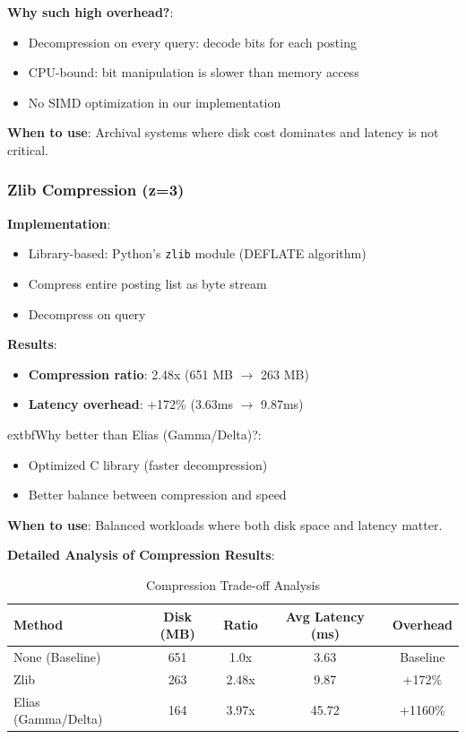 \documentclass[12pt,a4paper]{article}
\begin{document}
\textbf{Why such high overhead?}:
\begin{itemize}
    \item Decompression on every query: decode bits for each posting
    \item CPU-bound: bit manipulation is slower than memory access
    \item No SIMD optimization in our implementation
\end{itemize}

\textbf{When to use}: Archival systems where disk cost dominates and latency is not critical.

\subsubsection{Zlib Compression (z=3)}

\textbf{Implementation}:
\begin{itemize}
    \item Library-based: Python's \texttt{zlib} module (DEFLATE algorithm)
    \item Compress entire posting list as byte stream
    \item Decompress on query
\end{itemize}

\textbf{Results}:
\begin{itemize}
    \item \textbf{Compression ratio}: 2.48x (651 MB $\rightarrow$ 263 MB)
    \item \textbf{Latency overhead}: +172\% (3.63ms $\rightarrow$ 9.87ms)
\end{itemize}

	extbf{Why better than Elias (Gamma/Delta)?}:
\begin{itemize}
    \item Optimized C library (faster decompression)
    \item Better balance between compression and speed
\end{itemize}

\textbf{When to use}: Balanced workloads where both disk space and latency matter.

\textbf{Detailed Analysis of Compression Results}:

\begin{table}[H]
\centering
\begin{tabular}{lcccc}
\toprule
\textbf{Method} & \textbf{Disk (MB)} & \textbf{Ratio} & \textbf{Avg Latency (ms)} & \textbf{Overhead} \\
\midrule
None (Baseline) & 651 & 1.0x & 3.63 & Baseline \\
Zlib & 263 & 2.48x & 9.87 & +172\% \\
Elias (Gamma/Delta) & 164 & 3.97x & 45.72 & +1160\% \\
\bottomrule
\end{tabular}
\caption{Compression Trade-off Analysis}
\end{table}
\end{document}

